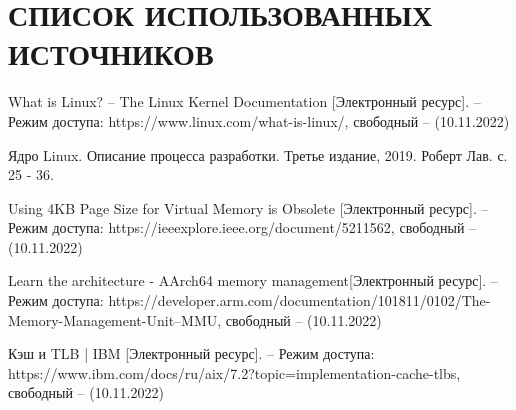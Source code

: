 \section*{СПИСОК ИСПОЛЬЗОВАННЫХ ИСТОЧНИКОВ}

\begingroup
\renewcommand{\section}[2]{}
\begin{thebibliography}{}
What is Linux? -- The Linux Kernel Documentation [Электронный ресурс]. – Режим доступа: https://www.linux.com/what-is-linux/, свободный – (10.11.2022)

Ядро Linux. Описание процесса разработки. Третье издание, 2019. Роберт Лав. с. 25 - 36.

Using 4KB Page Size for Virtual Memory is Obsolete [Электронный ресурс]. – Режим доступа: https://ieeexplore.ieee.org/document/5211562, свободный – (10.11.2022)

Learn the architecture - AArch64 memory management[Электронный ресурс]. – Режим доступа: https://developer.arm.com/documentation/101811/0102/The-Memory-Management-Unit--MMU, свободный – (10.11.2022)

Кэш и TLB | IBM [Электронный ресурс]. – Режим доступа: https://www.ibm.com/docs/ru/aix/7.2?topic=implementation-cache-tlbs, свободный – (10.11.2022)

\end{thebibliography}
\endgroup

\pagebreak